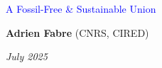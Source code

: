 \documentclass[aspectratio=169,xcolor=dvipsnames, 11pt,mathserif]{beamer}
\begin{document}
\begin{frame}
\thispagestyle{empty}
\begin{center}
\begin{LARGE}
\textcolor{blue}{A Fossil-Free \& Sustainable Union}
\end{LARGE}

\vspace{1cm}
\textbf{Adrien Fabre} (CNRS, CIRED)%




\medskip
{}
\textit{July 2025} 

\end{center}

\bigskip

\end{frame}
\end{document}
